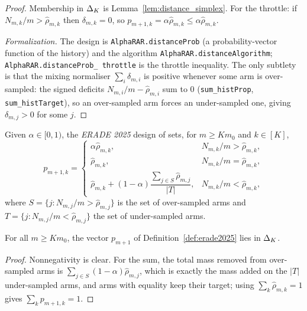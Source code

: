 \begin{proof}\leanok
{}
Membership in $\Delta_K$ is Lemma~\ref{lem:distance_simplex}. For the throttle:
if $N_{m,k}/m > \hat{\rho}_{m,k}$ then $\delta_{m,k} = 0$, so
$p_{m+1,k} = \alpha\hat{\rho}_{m,k} \le \alpha \hat{\rho}_{m,k}$.

\emph{Formalization.} The design is \texttt{AlphaRAR.distanceProb} (a probability-vector function of
the history) and the algorithm \texttt{AlphaRAR.distanceAlgorithm}; \texttt{AlphaRAR.distanceProb\_%
throttle} is the throttle inequality. The only subtlety is that the mixing normaliser $\sum_i
\delta_{m,i}$ is positive whenever some arm is over-sampled: the signed deficits
$N_{m,i}/m - \hat\rho_{m,i}$ sum to $0$ (\texttt{sum\_histProp}, \texttt{sum\_histTarget}), so an
over-sampled arm forces an under-sampled one, giving $\delta_{m,j}>0$ for some $j$.
\end{proof}

\begin{definition}\label{def:erade2025}
\leanok
{}
Given $\alpha \in [0,1)$, the \emph{ERADE 2025} design of
\cite{alkhnefr2025efficient} sets, for $m \ge K m_0$ and $k \in [K]$,
\[
  p_{m+1,k} =
  \begin{cases}
    \alpha \hat{\rho}_{m,k}, & N_{m,k}/m > \hat{\rho}_{m,k},\\
    \hat{\rho}_{m,k}, & N_{m,k}/m = \hat{\rho}_{m,k},\\
    \hat{\rho}_{m,k} + (1-\alpha)\dfrac{\sum_{j\in S}\hat{\rho}_{m,j}}{|T|},
      & N_{m,k}/m < \hat{\rho}_{m,k},
  \end{cases}
\]
where $S = \{ j : N_{m,j}/m > \hat{\rho}_{m,j}\}$ is the set of over-sampled arms
and $T = \{ j : N_{m,j}/m < \hat{\rho}_{m,j}\}$ the set of under-sampled arms.
\end{definition}

\begin{lemma}\label{lem:erade2025_simplex}
\leanok
{}
For all $m \ge K m_0$, the vector $p_{m+1}$ of Definition~\ref{def:erade2025}
lies in $\Delta_K$.
\end{lemma}

\begin{proof}\leanok
Nonnegativity is clear. For the sum, the total mass removed from over-sampled
arms is $\sum_{j\in S}(1-\alpha)\hat{\rho}_{m,j}$, which is exactly the mass
added on the $|T|$ under-sampled arms, and arms with equality keep their target;
using $\sum_k \hat{\rho}_{m,k} = 1$ gives $\sum_k p_{m+1,k} = 1$.
\end{proof}


